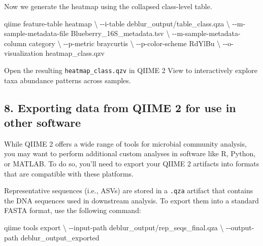 \documentclass[
]{book}
\newenvironment{Shaded}{\begin{snugshade}}{\end{snugshade}}
\newcommand{\AttributeTok}[1]{\textcolor[rgb]{0.13,0.29,0.53}{#1}}
\newcommand{\DataTypeTok}[1]{\textcolor[rgb]{0.13,0.29,0.53}{#1}}
\newcommand{\ExtensionTok}[1]{#1}
\newcommand{\NormalTok}[1]{#1}
\begin{document}
Now we generate the heatmap using the collapsed class-level table.

\begin{Shaded}
\begin{Highlighting}[]
\ExtensionTok{qiime}\NormalTok{ feature{-}table heatmap }\DataTypeTok{\textbackslash{}}
  \AttributeTok{{-}{-}i{-}table}\NormalTok{ deblur\_output/table\_class.qza }\DataTypeTok{\textbackslash{}}
  \AttributeTok{{-}{-}m{-}sample{-}metadata{-}file}\NormalTok{ Blueberry\_16S\_metadata.tsv }\DataTypeTok{\textbackslash{}}
  \AttributeTok{{-}{-}m{-}sample{-}metadata{-}column}\NormalTok{ category }\DataTypeTok{\textbackslash{}}
  \AttributeTok{{-}{-}p{-}metric}\NormalTok{ braycurtis }\DataTypeTok{\textbackslash{}}
  \AttributeTok{{-}{-}p{-}color{-}scheme}\NormalTok{ RdYlBu }\DataTypeTok{\textbackslash{}}
  \AttributeTok{{-}{-}o{-}visualization}\NormalTok{ heatmap\_class.qzv}
\end{Highlighting}
\end{Shaded}

Open the resulting \texttt{heatmap\_class.qzv} in QIIME 2 View to interactively explore taxa abundance patterns across samples.

\subsection{8. Exporting data from QIIME 2 for use in other software}\label{exporting-data}

While QIIME 2 offers a wide range of tools for microbial community analysis, you may want to perform additional custom analyses in software like R, Python, or MATLAB. To do so, you'll need to export your QIIME 2 artifacts into formats that are compatible with these platforms.

Representative sequences (i.e., ASVs) are stored in a \texttt{.qza} artifact that contains the DNA sequences used in downstream analysis. To export them into a standard FASTA format, use the following command:

\begin{Shaded}
\begin{Highlighting}[]
\ExtensionTok{qiime}\NormalTok{ tools export }\DataTypeTok{\textbackslash{}}
   \AttributeTok{{-}{-}input{-}path}\NormalTok{ deblur\_output/rep\_seqs\_final.qza }\DataTypeTok{\textbackslash{}}
   \AttributeTok{{-}{-}output{-}path}\NormalTok{ deblur\_output\_exported}
\end{Highlighting}
\end{Shaded}
\end{document}
